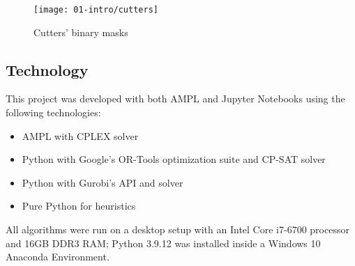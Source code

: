 \begin{figure}[H]
	\centering	
	\texttt{[image: 01-intro/cutters]}
	\caption{Cutters' binary masks}
	\label{fig:cutters}
\end{figure}

\subsection{Technology}
This project was developed with both AMPL and Jupyter Notebooks using the following technologies:
\begin{itemize}[itemsep=-1mm, topsep=-1mm]
	\item AMPL with CPLEX solver
	\item Python with Google's OR-Tools optimization suite and CP-SAT solver
	\item Python with Gurobi's API and solver
	\item Pure Python for heuristics
\end{itemize}

All algorithms were run on a desktop setup with an Intel Core i7-6700 processor and 16GB DDR3 RAM; Python 3.9.12 was installed inside a Windows 10 Anaconda Environment.
